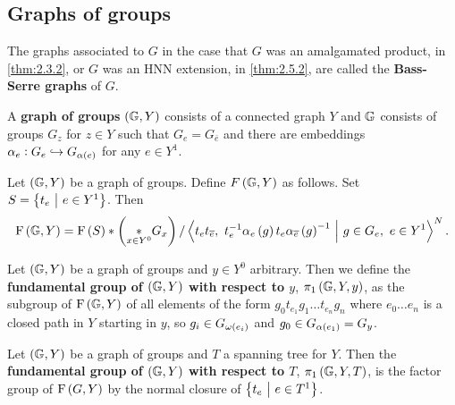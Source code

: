 \pagebreak

\subsection{Graphs of groups}


\begin{definition}
The graphs associated to $ G $ in the case that $ G $ was an amalgamated product, in \ref{thm:2.3.2}, or $ G $ was an HNN extension, in \ref{thm:2.5.2}, are called the \textbf{Bass-Serre graphs} of $ G $.
\end{definition}

\begin{definition}
A \textbf{graph of groups} $ \br{\GG, Y} $ consists of a connected graph $ Y $ and $ \mathbb{G} $ consists of groups $ G_z $ for $ z \in Y $ such that $ G_e = G_{\overline{e}} $ and there are embeddings $ \alpha_e : G_e \hookrightarrow G_{\alpha\br{e}} $ for any $ e \in Y^1 $.
\end{definition}

\begin{definition}
Let $ \br{\GG, Y} $ be a graph of groups. Define $ F\br{\GG, Y} $ as follows. Set $ S = \cbr{t_e \st e \in Y^1} $. Then
$$ \F\br{\GG, Y} = \F\br{S} * \br{\underset{x \in Y^0}{*} G_x} / \abr{t_et_{\overline{e}}, \ t_e^{-1}\alpha_e\br{g}t_e\alpha_{\overline{e}}\br{g}^{-1} \st g \in G_e, \ e \in Y^1}^N. $$
\end{definition}

\begin{definition}
Let $ \br{\GG, Y} $ be a graph of groups and $ y \in Y^0 $ arbitrary. Then we define the \textbf{fundamental group of $ \br{\GG, Y} $ with respect to $ y $}, $ \pi_1\br{\GG, Y, y} $, as the subgroup of $ \F\br{\GG, Y} $ of all elements of the form $ g_0t_{e_1}g_1 \dots t_{e_n}g_n $ where $ e_0 \dots e_n $ is a closed path in $ Y $ starting in $ y $, so $ g_i \in G_{\omega\br{e_i}} $ and $ g_0 \in G_{\alpha\br{e_1}} = G_y $.
\end{definition}

\begin{definition}
Let $ \br{\GG, Y} $ be a graph of groups and $ T $ a spanning tree for $ Y $. Then the \textbf{fundamental group of $ \br{\GG, Y} $ with respect to $ T $}, $ \pi_1\br{\GG, Y, T} $, is the factor group of $ \F\br{G, Y} $ by the normal closure of $ \cbr{t_e \st e \in T^1} $.
\end{definition}

